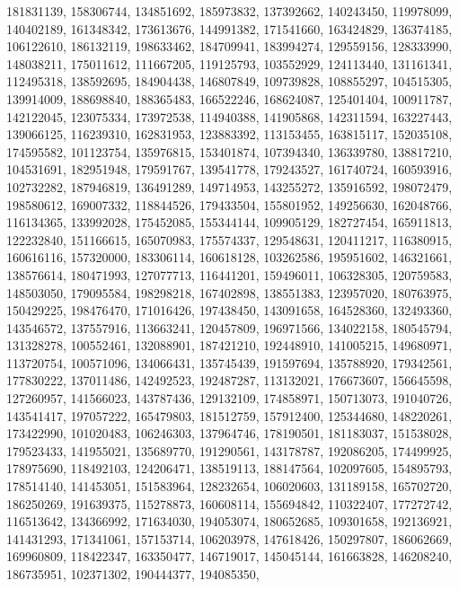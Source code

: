 {{    181831139, 158306744, 134851692, 185973832, 137392662, 140243450,
    119978099, 140402189, 161348342, 173613676, 144991382, 171541660,
    163424829, 136374185, 106122610, 186132119, 198633462, 184709941,
    183994274, 129559156, 128333990, 148038211, 175011612, 111667205,
    119125793, 103552929, 124113440, 131161341, 112495318, 138592695,
    184904438, 146807849, 109739828, 108855297, 104515305, 139914009,
    188698840, 188365483, 166522246, 168624087, 125401404, 100911787,
    142122045, 123075334, 173972538, 114940388, 141905868, 142311594,
    163227443, 139066125, 116239310, 162831953, 123883392, 113153455,
    163815117, 152035108, 174595582, 101123754, 135976815, 153401874,
    107394340, 136339780, 138817210, 104531691, 182951948, 179591767,
    139541778, 179243527, 161740724, 160593916, 102732282, 187946819,
    136491289, 149714953, 143255272, 135916592, 198072479, 198580612,
    169007332, 118844526, 179433504, 155801952, 149256630, 162048766,
    116134365, 133992028, 175452085, 155344144, 109905129, 182727454,
    165911813, 122232840, 151166615, 165070983, 175574337, 129548631,
    120411217, 116380915, 160616116, 157320000, 183306114, 160618128,
    103262586, 195951602, 146321661, 138576614, 180471993, 127077713,
    116441201, 159496011, 106328305, 120759583, 148503050, 179095584,
    198298218, 167402898, 138551383, 123957020, 180763975, 150429225,
    198476470, 171016426, 197438450, 143091658, 164528360, 132493360,
    143546572, 137557916, 113663241, 120457809, 196971566, 134022158,
    180545794, 131328278, 100552461, 132088901, 187421210, 192448910,
    141005215, 149680971, 113720754, 100571096, 134066431, 135745439,
    191597694, 135788920, 179342561, 177830222, 137011486, 142492523,
    192487287, 113132021, 176673607, 156645598, 127260957, 141566023,
    143787436, 129132109, 174858971, 150713073, 191040726, 143541417,
    197057222, 165479803, 181512759, 157912400, 125344680, 148220261,
    173422990, 101020483, 106246303, 137964746, 178190501, 181183037,
    151538028, 179523433, 141955021, 135689770, 191290561, 143178787,
    192086205, 174499925, 178975690, 118492103, 124206471, 138519113,
    188147564, 102097605, 154895793, 178514140, 141453051, 151583964,
    128232654, 106020603, 131189158, 165702720, 186250269, 191639375,
    115278873, 160608114, 155694842, 110322407, 177272742, 116513642,
    134366992, 171634030, 194053074, 180652685, 109301658, 192136921,
    141431293, 171341061, 157153714, 106203978, 147618426, 150297807,
    186062669, 169960809, 118422347, 163350477, 146719017, 145045144,
    161663828, 146208240, 186735951, 102371302, 190444377, 194085350,
}}
